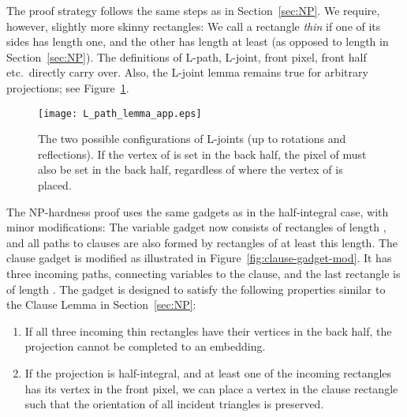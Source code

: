 \documentclass[12pt]{article}
\begin{document}
\begin{appendix}
The proof strategy follows the same steps as in Section~\ref{sec:NP}.
We require, however, slightly more skinny rectangles: We call a rectangle
\emph{thin} if one of its sides has length one, and the other has length at least 
(as opposed to length  in Section~\ref{sec:NP}). The definitions of L-path, L-joint,
front pixel, front half etc.~directly carry over. Also, the L-joint lemma remains
true for arbitrary projections; see Figure~\ref{fig:L-joint-mod}.

\begin{figure}
\begin{center}
\texttt{[image: L\_path\_lemma\_app.eps]}
\end{center}
\caption{The two possible configurations of L-joints (up to rotations and reflections).
If the vertex of  is set in the back half, the pixel of  must also be set
in the back half, regardless of where the vertex of  is placed.}
\label{fig:L-joint-mod}
\end{figure}

The NP-hardness proof uses the same gadgets as in the half-integral case,
with minor modifications: The variable gadget now consists of rectangles of length ,
and all paths to clauses are also formed by rectangles of at least this length.
The clause gadget is modified as illustrated in Figure~\ref{fig:clause-gadget-mod}.
It has three incoming paths, connecting variables to the clause, and the last rectangle
is of length . The gadget is designed to satisfy the following properties 
similar to the Clause Lemma in Section~\ref{sec:NP}:
\begin{enumerate}
\item If all three incoming thin rectangles have their vertices in the back half,
      the projection cannot be completed to an embedding.
\item If the projection is half-integral, and at least one of the incoming rectangles
      has its vertex in the front pixel, we can place a vertex in the clause rectangle
      such that the orientation of all incident triangles is preserved.
\end{enumerate}



\end{appendix}
\end{document}
